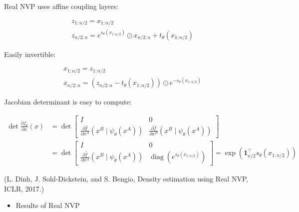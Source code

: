 \begin{definition}
    Real NVP uses affine coupling layers:

    $$
    \begin{aligned}
    & z_{1: n / 2}=x_{1: n / 2} \\
    & z_{n / 2: n}=e^{s_{\theta}\left(x_{1: n / 2}\right)} \odot x_{n / 2: n}+t_{\theta}\left(x_{1: n / 2}\right)
    \end{aligned}
    $$

    Easily invertible:

    $$
    \begin{aligned}
    & x_{1: n / 2}=z_{1: n / 2} \\
    & x_{n / 2: n}=\left(z_{n / 2: n}-t_{\theta}\left(x_{1: n / 2}\right)\right) \odot e^{-s_{\theta}\left(x_{1: n / 2}\right)}
    \end{aligned}
    $$

    Jacobian determinant is easy to compute:

    $$
    \begin{aligned}
    \operatorname{det} \frac{\partial f_{\theta}}{\partial x}(x) & =\operatorname{det}\left[\begin{array}{cc}
    I & 0 \\
    \frac{\partial \hat{f}}{\partial x^{A}}\left(x^{B} \mid \psi_{\theta}\left(x^{A}\right)\right) & \frac{\partial \hat{f}}{\partial x^{B}}\left(x^{B} \mid \psi_{\theta}\left(x^{A}\right)\right)
    \end{array}\right] \\
    & =\operatorname{det}\left[\begin{array}{cc}
    I & 0 \\
    \frac{\partial \hat{f}}{\partial x^{A}}\left(x^{B} \mid \psi_{\theta}\left(x^{A}\right)\right) & \operatorname{diag}\left(e^{s_{\theta}\left(x_{1: n / 2}\right)}\right)
    \end{array}\right]=\exp \left(\mathbf{1}_{n / 2}^{\top} s_{\theta}\left(x_{1: n / 2}\right)\right)
    \end{aligned}
    $$

    (L. Dinh, J. Sohl-Dickstein, and S. Bengio, Density estimation using Real NVP, ICLR, 2017.)
\end{definition}

\begin{itemize}
    \item Results of Real NVP
\end{itemize}

